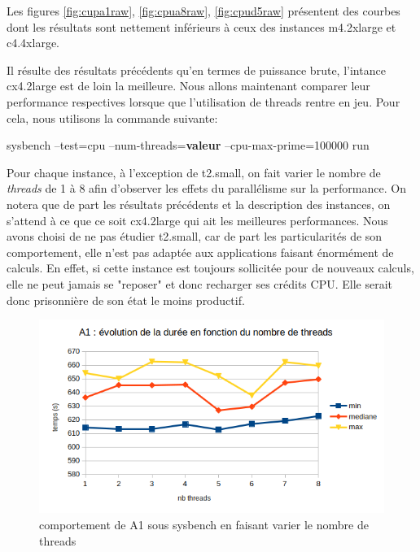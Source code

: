 \documentclass[11pt]{article}
\begin{document}
Les figures  \ref{fig:cupa1raw}, \ref{fig:cpua8raw}, \ref{fig:cpud5raw} présentent des courbes dont les résultats sont nettement inférieurs à ceux des instances m4.2xlarge et c4.4xlarge.

Il résulte des résultats précédents qu'en termes de puissance
brute, l'intance cx4.2large est de loin la meilleure. Nous allons maintenant comparer leur performance respectives lorsque que l'utilisation de threads rentre en jeu. Pour cela,
nous utilisons la commande suivante:
\newline
\begin{center}
	sysbench --test=cpu --num-threads=\textbf{valeur} --cpu-max-prime=100000 run
\end{center}

Pour chaque instance, à l'exception de t2.small, on fait varier le nombre de \textit{threads} de 1 à 8 afin d'observer les effets du parallélisme sur la performance. On notera que de part les résultats précédents et la description des instances, on s'attend à ce que ce soit cx4.2large qui ait les meilleures performances. Nous avons choisi de ne pas étudier t2.small, car de part les particularités de son comportement, elle n'est pas adaptée aux applications faisant énormément de calculs. En effet, si cette instance est toujours sollicitée pour de nouveaux calculs, elle ne peut jamais se "reposer" et donc recharger ses crédits CPU. Elle serait donc prisonnière de son état le moins productif.
\begin{figure}
\centering
\includegraphics[width=0.9\linewidth]{images/cpuA1threads}
\caption{comportement de A1 sous sysbench en faisant varier le nombre de threads}
\label{fig:cpua1threads}
\end{figure}
\end{document}
